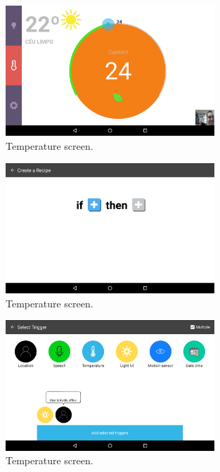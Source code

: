\begin{figure}[h]
\centering
\includegraphics[width=0.7\textwidth]{Figures/screen_temperature}
\caption{Temperature screen.}
\label{screen_temperature}
\end{figure}



\begin{figure}[h]
\centering
\includegraphics[width=0.7\textwidth]{Figures/create_recipe}
\caption{Temperature screen.}
\label{create_recipe}
\end{figure}

\begin{figure}[h]
\centering
\includegraphics[width=0.7\textwidth]{Figures/screen_trigger}
\caption{Temperature screen.}
\label{screen_triggers}
\end{figure}

